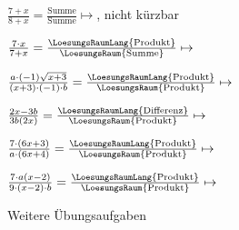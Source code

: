 \begin{bbwAufgabenBlock}
\item  $\frac{7+x}{8+x} = \frac{\textrm{Summe}}{\textrm{Summe}} \mapsto $, nicht kürzbar

\item $\frac{7\cdot{}x}{7+x} = \frac{\LoesungsRaumLang{\textrm{Produkt}}}{\LoesungsRaum{\textrm{Summe}}} \mapsto $

\item $\frac{a\cdot{}(-1)\sqrt{x+3}}{(x+3)\cdot{}(-1)\cdot{}b}
= \frac{\LoesungsRaumLang{\textrm{Produkt}}}{\LoesungsRaum{\textrm{Produkt}}} \mapsto
$ 

\item $\frac{2x-3b}{3b(2x)} = \frac{\LoesungsRaumLang{\textrm{Differenz}}}{\LoesungsRaum{\textrm{Produkt}}} \mapsto $

\item $\frac{7\cdot{}(6x+3)}{a\cdot{}(6x+4)}
= \frac{\LoesungsRaumLang{\textrm{Produkt}}}{\LoesungsRaum{\textrm{Produkt}}} \mapsto
$ 

\item $\frac{7\cdot{}a(x-2)}{9\cdot{}(x-2)\cdot{}b} = \frac{\LoesungsRaumLang{\textrm{Produkt}}}{\LoesungsRaum{\textrm{Produkt}}} \mapsto $ 

\end{bbwAufgabenBlock}

\newpage
Weitere Übungsaufgaben


